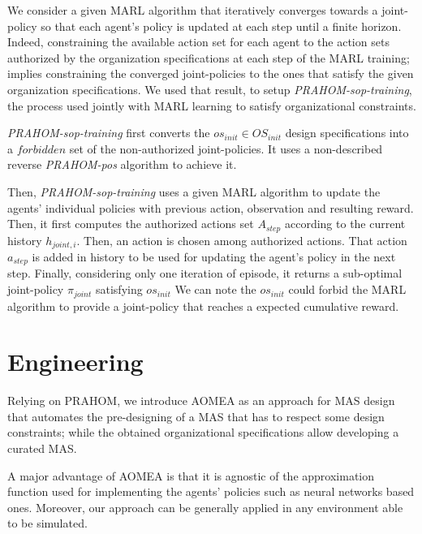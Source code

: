 \documentclass[runningheads]{llncs}
\begin{document}
We consider a given MARL algorithm that iteratively converges towards a joint-policy so that each agent's policy is updated at each step until a finite horizon. Indeed, constraining the available action set for each agent to the action sets authorized by the organization specifications at each step of the MARL training; implies constraining the converged joint-policies to the ones that satisfy the given organization specifications. We used that result, to setup \emph{PRAHOM-sop-training}, the process used jointly with MARL learning to satisfy organizational constraints.

\emph{PRAHOM-sop-training} first converts the $os_{init} \in OS_{init}$ design specifications into a $forbidden$ set of the non-authorized joint-policies. It uses a non-described reverse \emph{PRAHOM-pos} algorithm to achieve it.

Then, \emph{PRAHOM-sop-training} uses a given MARL algorithm to update the agents' individual policies with previous action, observation and resulting reward. Then, it first computes the authorized actions set $A_{step}$ according to the current history $h_{joint,i}$. Then, an action is chosen among authorized actions. That action $a_{step}$ is added in history to be used for updating the agent's policy in the next step.
Finally, considering only one iteration of episode, it returns a sub-optimal joint-policy $\pi_{joint}$ satisfying $os_{init}$
We can note the $os_{init}$ could forbid the MARL algorithm to provide a joint-policy that reaches a expected cumulative reward.

\section{Engineering}

Relying on PRAHOM, we introduce AOMEA as an approach for MAS design that automates the pre-designing of a MAS that has to respect some design constraints; while the obtained organizational specifications allow developing a curated MAS.

A major advantage of AOMEA is that it is agnostic of the approximation function used for implementing the agents' policies such as neural networks based ones. Moreover, our approach can be generally applied in any environment able to be simulated.
\end{document}
